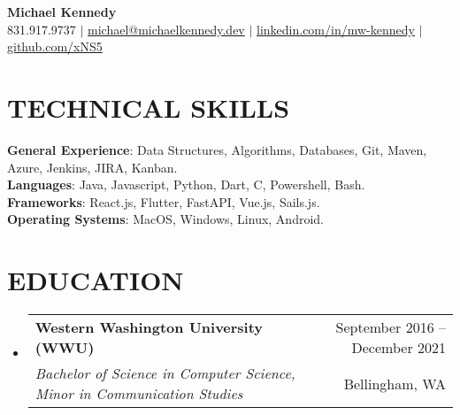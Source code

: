 \documentclass[letterpaper,11pt]{article}
\makeatletter
\newcommand{\resumeSubheading}[4]{
  \vspace{-1pt}\item
    \begin{tabular*}{\textwidth}[t]{l@{\extracolsep{\fill}}r}
      \textbf{#1} & {\color{dark-grey}\small #2}\vspace{1pt}\\ %
      \textit{#3} & {\color{dark-grey} \small #4}\\ %
    \end{tabular*}\vspace{-4pt}
}
\newcommand{\resumeSubHeadingListStart}{\begin{itemize}[leftmargin=0in, label={}]}
\newcommand{\resumeSubHeadingListEnd}{\end{itemize}}
\makeatother
\begin{document}

\begin{center}

    \textbf{\Huge Michael Kennedy} \\ \vspace{5pt}
    \small \faPhone \hspace{2pt} 831.917.9737 \hspace{1pt} $|$
    \hspace{1pt} \faEnvelope \hspace{2pt} \href{mailto:michael@michaelkennedy.dev}{michael@michaelkennedy.dev} \hspace{1pt} $|$ 
    \hspace{1pt} \faLinkedinSquare \hspace{2pt} \href{https://www.linkedin.com/in/mw-kennedy}{linkedin.com/in/mw-kennedy} \hspace{1pt}$|$
    \hspace{1pt} \faGithubSquare \hspace{2pt} \href{https://github.com/xNS5}{github.com/xNS5}
    \\ \vspace{-3pt}
\end{center}

\section{TECHNICAL SKILLS}
 \begin{itemize}[leftmargin=0in, label={}]
    \small{\item{
    \textbf{General Experience}{: Data Structures, Algorithms, Databases, Git, Maven, Azure, Jenkins, JIRA, Kanban.}\\
     \textbf{Languages}{: Java, Javascript, Python, Dart, C, Powershell, Bash.} \\
     \textbf{Frameworks}{: React.js, Flutter, FastAPI, Vue.js, Sails.js.}\\
     \textbf{Operating Systems}{: MacOS, Windows, Linux, Android.}
    }}
 \end{itemize}
 
\section {EDUCATION}
  \resumeSubHeadingListStart
    \resumeSubheading
      {Western Washington University (WWU)}{September 2016 -- December 2021}
      {Bachelor of Science in Computer Science, Minor in Communication Studies}{Bellingham, WA} 
  \resumeSubHeadingListEnd
\end{document}

